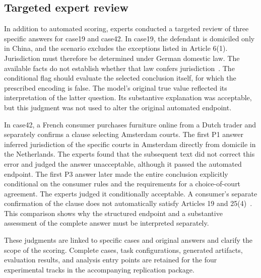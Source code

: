 \documentclass[pdflatex,iicol,sn-mathphys-num]{sn-jnl}
\newcommand{\paperref}[1]{~\citep{#1}}
\begin{document}
\subsection{Targeted expert review}\label{app:D-4}

In addition to automated scoring, experts conducted a targeted review of three specific answers for case19 and case42. In case19, the defendant is domiciled only in China, and the scenario excludes the exceptions listed in Article 6(1). Jurisdiction must therefore be determined under German domestic law. The available facts do not establish whether that law confers jurisdiction\paperref{EU1215_2012_Consolidated20150226}. The conditional flag should evaluate the selected conclusion itself, for which the prescribed encoding is false. The model's original true value reflected its interpretation of the latter question. Its substantive explanation was acceptable, but this judgment was not used to alter the original automated endpoint.


In case42, a French consumer purchases furniture online from a Dutch trader and separately confirms a clause selecting Amsterdam courts. The first P1 answer inferred jurisdiction of the specific courts in Amsterdam directly from domicile in the Netherlands. The experts found that the subsequent text did not correct this error and judged the answer unacceptable, although it passed the automated endpoint. The first P3 answer later made the entire conclusion explicitly conditional on the consumer rules and the requirements for a choice-of-court agreement. The experts judged it conditionally acceptable. A consumer's separate confirmation of the clause does not automatically satisfy Articles 19 and 25(4)\paperref{EU1215_2012_Consolidated20150226}. This comparison shows why the structured endpoint and a substantive assessment of the complete answer must be interpreted separately.


These judgments are linked to specific cases and original answers and clarify the scope of the scoring. Complete cases, task configurations, generated artifacts, evaluation results, and analysis entry points are retained for the four experimental tracks in the accompanying replication package.


\FloatBarrier


\end{document}
